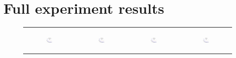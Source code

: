 \section{Full experiment results}
\label{app:exptresults}
\begin{figure}[ht]
  \centering
  \begin{tabular}{cccc}
	  \begin{subfigure}[b]{0.22\textwidth}
	  	\includegraphics[width=110pt]{images/runtime_bigsynthetic_maxgraphcut.pdf}
			\caption{}
			\label{appfig:runtime_bigsynthetic_maxgraphcut}
	  \end{subfigure} &
	  \begin{subfigure}[b]{0.22\textwidth}
	  	\includegraphics[width=110pt]{images/runtime_bigsynthetic_setcover.pdf}
			\caption{}
			\label{appfig:runtime_bigsynthetic_setcover}
	  \end{subfigure} &
	  \begin{subfigure}[b]{0.22\textwidth}
	  	\includegraphics[width=110pt]{images/runtime_zigzag_maxgraphcut.pdf}
			\caption{}
			\label{appfig:runtime_zigzag_maxgraphcut}
	  \end{subfigure} &
	  \begin{subfigure}[b]{0.22\textwidth}
	  	\includegraphics[width=110pt]{images/runtime_zigzag_setcover.pdf}

\end{subfigure}
\end{tabular}
\end{figure}

